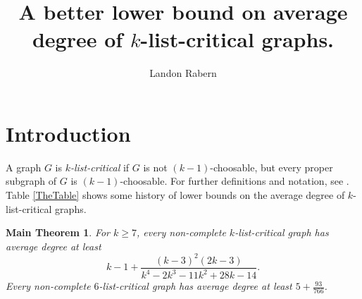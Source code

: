 \documentclass[10pt]{article}
\title{A better lower bound on average degree of $k$-list-critical graphs.}
\author{Landon Rabern}
\theoremstyle{plain}
\newtheorem*{MainTheorem}{Main Theorem}
\theoremstyle{definition}
\theoremstyle{remark}
\begin{document}
\maketitle

\section{Introduction}
A graph $G$ is \emph{$k$-list-critical} if $G$ is not $(k-1)$-choosable, but every
proper subgraph of $G$ is $(k-1)$-choosable.  For further definitions and notation, see \cite{OreVizing, DischargingLowerBound}. 
Table \ref{TheTable} shows some history of lower bounds on the average degree of $k$-list-critical graphs.

\begin{MainTheorem}
For $k \ge 7$, every non-complete $k$-list-critical graph has average degree at least \[k-1 + \frac{(k-3)^2 (2 k-3)}{k^4-2 k^3-11 k^2+28 k-14}.\]
Every non-complete $6$-list-critical graph has average degree at least $5 + \frac{93}{766}$.
\end{MainTheorem}
\end{document}
